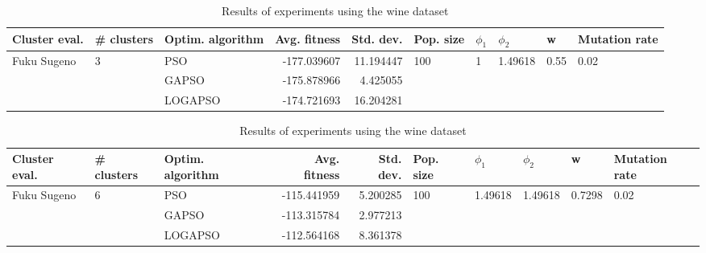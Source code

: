 \documentclass{article}
\begin{document}
\begin{table}
\centering
\caption{Results of experiments using the wine dataset}
\begin{tabular}{lllrrlllll}
\toprule
               Cluster eval. &        \# clusters & Optim. algorithm &  Avg. fitness &  Std. dev. &            Pop. size &         $\phi_{1}$ &               $\phi_{2}$ &                     w &         Mutation rate \\
\midrule
\multirow{3}{*}{Fuku Sugeno} & \multirow{3}{*}{3} &              PSO &   -177.039607 &  11.194447 & \multirow{3}{*}{100} & \multirow{3}{*}{1} & \multirow{3}{*}{1.49618} & \multirow{3}{*}{0.55} & \multirow{3}{*}{0.02} \\
                             &                    &            GAPSO &   -175.878966 &   4.425055 &                      &                    &                          &                       &                       \\
                             &                    &          LOGAPSO &   -174.721693 &  16.204281 &                      &                    &                          &                       &                       \\
\bottomrule
\end{tabular}
\end{table}
\begin{table}
\centering
\caption{Results of experiments using the wine dataset}
\begin{tabular}{lllrrlllll}
\toprule
               Cluster eval. &        \# clusters & Optim. algorithm &  Avg. fitness &  Std. dev. &            Pop. size &               $\phi_{1}$ &               $\phi_{2}$ &                       w &         Mutation rate \\
\midrule
\multirow{3}{*}{Fuku Sugeno} & \multirow{3}{*}{6} &              PSO &   -115.441959 &   5.200285 & \multirow{3}{*}{100} & \multirow{3}{*}{1.49618} & \multirow{3}{*}{1.49618} & \multirow{3}{*}{0.7298} & \multirow{3}{*}{0.02} \\
                             &                    &            GAPSO &   -113.315784 &   2.977213 &                      &                          &                          &                         &                       \\
                             &                    &          LOGAPSO &   -112.564168 &   8.361378 &                      &                          &                          &                         &                       \\
\bottomrule
\end{tabular}
\end{table}
\end{document}
